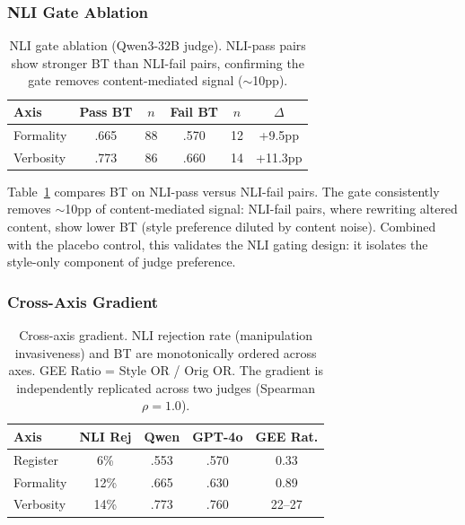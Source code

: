 \documentclass[11pt]{article}
\begin{document}
\subsubsection{NLI Gate Ablation}
\label{sec:nli_ablation}

\begin{table}[t]
\centering
\small
\begin{tabular}{lccccc}
\toprule
\textbf{Axis} & \textbf{Pass BT} & $n$ & \textbf{Fail BT} & $n$ & \textbf{$\Delta$} \\
\midrule
Formality & .665 & 88 & .570 & 12 & +9.5pp \\
Verbosity & .773 & 86 & .660 & 14 & +11.3pp \\
\bottomrule
\end{tabular}
\caption{NLI gate ablation (Qwen3-32B judge). NLI-pass pairs show stronger BT than NLI-fail pairs, confirming the gate removes content-mediated signal ($\sim$10pp).}
\label{tab:nli_ablation}
\end{table}

Table~\ref{tab:nli_ablation} compares BT on NLI-pass versus NLI-fail pairs.
The gate consistently removes $\sim$10pp of content-mediated signal: NLI-fail pairs, where rewriting altered content, show lower BT (style preference diluted by content noise).
Combined with the placebo control, this validates the NLI gating design: it isolates the style-only component of judge preference.

\subsubsection{Cross-Axis Gradient}
\label{sec:gradient}

\begin{table}[t]
\centering
\small
\setlength{\tabcolsep}{3pt}
\begin{tabular}{lcccc}
\toprule
\textbf{Axis} & \textbf{NLI Rej} & \textbf{Qwen} & \textbf{GPT-4o} & \textbf{GEE Rat.} \\
\midrule
Register   & 6\%  & .553 & .570 & 0.33 \\
Formality  & 12\% & .665 & .630 & 0.89 \\
Verbosity  & 14\% & .773 & .760 & 22--27 \\
\bottomrule
\end{tabular}
\caption{Cross-axis gradient. NLI rejection rate (manipulation invasiveness) and BT are monotonically ordered across axes. GEE Ratio = Style OR / Orig OR. The gradient is independently replicated across two judges (Spearman $\rho = 1.0$).}
\label{tab:gradient}
\end{table}
\end{document}
